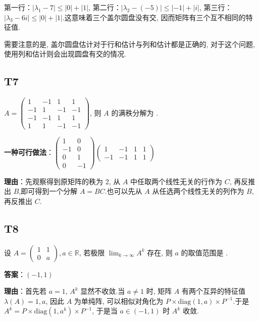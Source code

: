 \documentclass{article}
\begin{document}
第一行：$|\lambda_1-7|\leq |0| + |1|$, 第二行：$|\lambda_2-(-5)|\leq |-1| + |i|$, 第三行：$|\lambda_3-6i|\leq |0| + |1|$.这意味着三个盖尔圆盘没有交, 因而矩阵有三个互不相同的特征值.

需要注意的是, 盖尔圆盘估计对于行和估计与列和估计都是正确的, 对于这个问题, 使用列和估计则会出现圆盘有交的情况.

\subsection{T7}

\par $A=\begin{pmatrix}
	1 & -1 & 1 & 1\\
	-1 & 1 & -1 & -1\\
	-1 & -1 & 1 & 1\\
	1 & 1 & -1 & -1
\end{pmatrix}$, 则 $A$ 的满秩分解为 \underline{\phantom{empty\_space}}.

\par \textbf{一种可行做法}：$\begin{pmatrix}
	1 & 0\\
	-1 & 0\\
	0 & 1\\
	0 & -1
\end{pmatrix} \begin{pmatrix}
	1 & -1 & 1 & 1\\
	-1 & -1 & 1 & 1
\end{pmatrix}$

\par \textbf{理由}：先观察得到原矩阵的秩为 2, 从 $A$ 中任取两个线性无关的行作为 $C$, 再反推出 $B$,即可得到一个分解 $A=BC$.也可以先从 $A$ 从任选两个线性无关的列作为 $B$, 再反推出 $C$.

\subsection{T8}

\par 设 $A=\begin{pmatrix}
	1 & 1\\
	0 & a
\end{pmatrix}, a\in \mathbb R$, 若极限 $\lim_{k\to \infty}A^k$ 存在, 则 $a$ 的取值范围是 \underline{\phantom{empty\_space}}.

\par \textbf{答案}：$(-1, 1)$

\par \textbf{理由}：首先若 $a=1$, $A^k$ 显然不收敛.当 $a\neq 1$ 时, 矩阵 $A$ 有两个互异的特征值 $\lambda(A)={1, a}$, 因此 $A$ 为单纯阵, 可以相似对角化为 $P\times \text{diag}(1, a)\times P^{-1}$.于是 $A^k=P\times \text{diag}(1, a^k)\times P^{-1}$, 于是当 $a\in(-1, 1)$ 时 $A^k$ 收敛.
\end{document}
